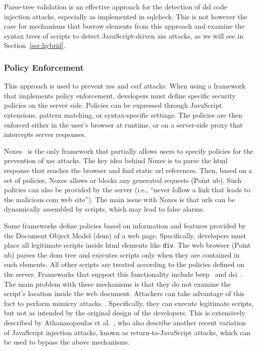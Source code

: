 \documentclass[conference]{IEEEtran}
\begin{document}
Parse-tree validation is an effective approach
for the detection of {\sc dsl} code injection attacks,
especially as implemented in {\sc sql}check.
This is not however the case
for mechanisms that borrow elements from
this approach and examine the syntax trees
of scripts to detect JavaScript-driven {\sc xss} attacks,
as we will see in Section~\ref{sec:hybrid}.

\subsubsection{Policy Enforcement}
\label{sec:policy}

This approach is used to prevent {\sc xss} and {\sc csrf} attacks. When
using a framework that implements policy enforcement, developers must
define specific security policies on the server side. Policies can be
expressed through JavaScript extensions, pattern matching, or
syntax-specific settings. The policies are then enforced either in the user's
browser at runtime, or on a server-side proxy that intercepts server
responses.

Noxes~\cite{KKVJ06,KJKV09} is the only
framework that partially allows
users to specify policies for the prevention of {\sc xss} attacks.
The key idea behind Noxes is to parse
the {\sc html} response that reaches the browser and
find static {\sc url} references. Then, based on
a set of policies, Noxes allows or blocks
any generated requests (Point {\sc ub}). Such policies
can also be provided by the server (i.e., ``never
follow a link that leads to the malicious.com
web site''). The main issue with Noxes is that
{\sc url}s can be dynamically assembled by scripts,
which may lead to false alarms.

Some frameworks define policies based on information and
features provided by the Document Object Model ({\sc dom}) of a web
page. Specifically, developers must place all legitimate scripts
inside {\sc html} elements like {\tt div}. The web browser (Point {\sc
  ub}) parses the {\sc dom} tree and executes scripts only when they
are contained in such elements. All other scripts are treated
according to the policies defined on the server. Frameworks that
support this functionality include {\sc beep}~\cite{TNH07} and {\sc
  dsi}~\cite{NSS06}. The main problem with these mechanisms is that
they do not examine the script's location inside the web document.
Attackers can take advantage of this fact to perform mimicry attacks~\cite{WS02}.
Specifically, they can execute legitimate scripts, but not as intended
by the original design of the developers. This is extensively
described by Athanasopoulos et al.~\cite{APKLM10}, who also describe
another recent variation of JavaScript injection attacks, known as
return-to-JavaScript attacks, which can be used to bypass the above
mechanisms.
\end{document}
